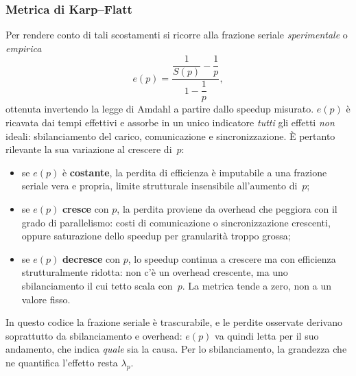\subsubsection{Metrica di Karp--Flatt}
Per rendere conto di tali scostamenti si ricorre alla frazione seriale
\emph{sperimentale} o \emph{empirica}
\begin{equation}
    e(p) = \frac{\dfrac{1}{S(p)} - \dfrac{1}{p}}{1 - \dfrac{1}{p}},
    \label{eq:karp-flatt}
\end{equation}
ottenuta invertendo la legge di Amdahl a partire dallo speedup misurato. $e(p)$
è ricavata dai tempi effettivi e assorbe in un unico indicatore \emph{tutti} gli
effetti \textit{non} ideali: sbilanciamento del carico, comunicazione e
sincronizzazione. È pertanto rilevante la sua variazione al crescere di~$p$:
%
\begin{itemize}
    \item se $e(p)$ è \textbf{costante}, la perdita di efficienza è
    imputabile a una frazione seriale vera e propria, limite strutturale
    insensibile all'aumento di~$p$;
    \item se $e(p)$ \textbf{cresce} con $p$, la perdita proviene da
    overhead che peggiora con il grado di parallelismo: costi di
    comunicazione o sincronizzazione crescenti, oppure saturazione
    dello speedup per granularità troppo grossa;
    \item se $e(p)$ \textbf{decresce} con $p$, lo speedup continua a
    crescere ma con efficienza strutturalmente ridotta: non c'è un
    overhead crescente, ma uno sbilanciamento il cui tetto scala
    con~$p$. La metrica tende a zero, non a un valore fisso.
\end{itemize}
%
In questo codice la frazione seriale è trascurabile, e le perdite osservate
derivano soprattutto da sbilanciamento e overhead: $e(p)$ va quindi letta per il
suo andamento, che indica \emph{quale} sia la causa. Per lo sbilanciamento, la
grandezza che ne quantifica l'effetto resta $\lambda_p$.

